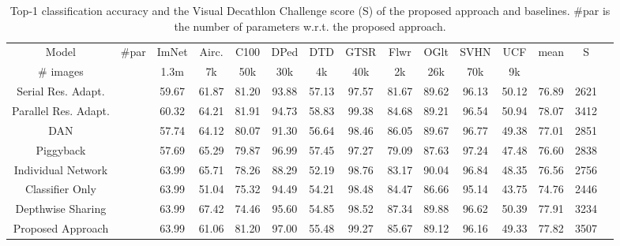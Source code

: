 \documentclass[letterpaper]{article} \usepackage{aaai19}  \usepackage{times}  \usepackage{helvet}  \usepackage{courier}  \usepackage{url}  \usepackage{graphicx}  \usepackage{amssymb}
\begin{document}
\def\arraystretch{1.2}\begin{table*}[!htb]
	\small
	\begin{center}
		\begin{tabular}{c c c c c c c c c c c c c c c} 
			
		    Model	& \#par  & ImNet  & Airc. & C100  & DPed & DTD & GTSR & Flwr & OGlt & SVHN  &UCF  & mean & S \\
			
			\# images & & 1.3m & 7k &50k& 30k& 4k &40k& 2k &26k& 70k& 9k \\
			\hline
    
    		Serial Res. Adapt. &    & 59.67 & 61.87 & 81.20  & 93.88&  57.13 & 97.57 & 81.67& 89.62 & 96.13 & 50.12  & 76.89 & 2621\\
    
    		Parallel Res. Adapt. &   &60.32& 64.21 &81.91 &94.73 &58.83 &99.38 &84.68& 89.21& 96.54& 50.94 & 78.07 & 3412\\
    		\hline
        	DAN &  & 57.74 &  64.12 & 80.07 & 91.30 & 56.64 & 98.46 & 86.05 & 89.67 & 96.77 & 49.38 & 77.01 & 2851  \\
            \hline
    
            Piggyback &  & 57.69 &65.29 & 79.87 & 96.99& 57.45 & 97.27 & 79.09 &87.63 & 97.24 & 47.48 & 76.60 & 2838  \\
            \hline		
    		Individual Network &  &  63.99&  65.71&  78.26& 88.29 & 52.19 & 98.76& 83.17 &90.04 & 96.84 & 48.35& 76.56 & 2756 \\

    		Classifier Only &  & 63.99& 51.04 & 75.32& 94.49 & 54.21& 98.48& 84.47 & 86.66 & 95.14 & 43.75 &74.76 & 2446  \\
    		
    		Depthwise Sharing &  & 63.99 & 67.42& 74.46 & 95.60& 54.85 & 98.52& 87.34 & 89.88 & 96.62 &50.39 & 77.91 &  3234 \\

    		Proposed Approach &  & 63.99 & 61.06 & 81.20 & 97.00 & 55.48 & 99.27 & 85.67 & 89.12 & 96.16 & 49.33 & 77.82 & 3507 \\
			\hline 
		\end{tabular}
	\end{center}
		\caption{ {\textnormal{Top-1 classification accuracy and the Visual Decathlon Challenge score (S) of the proposed approach and baselines. \#par is the number of parameters w.r.t. the proposed approach.
}}}
	\label{table:results}
\end{table*}
\end{document}
